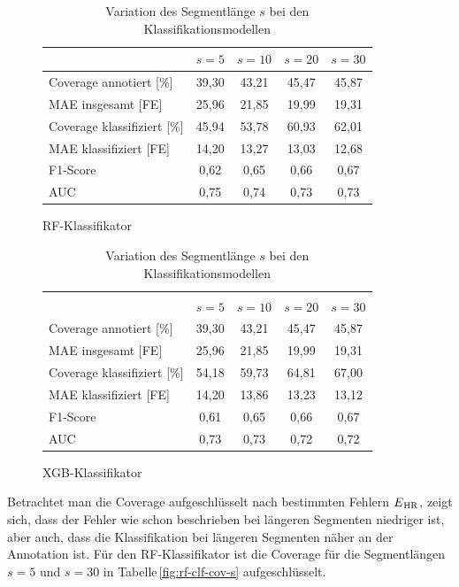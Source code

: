 \begin{table}[H]
	\begin{subfigure}{\textwidth}
	\centering
	\begin{tabular}{l || c | c | c | c }
								& $s = 5$	& $s=10$		& $s=20$		& $s=30$	\\ \hline
	Coverage annotiert [\%]		& 39,30		& 43,21	 	& 45,47		& 45,87\\
	\ac{MAE} insgesamt [FE]		& 25,96		& 21,85		& 19,99		& 19,31\\\hline
 	Coverage klassifiziert [\%]	& 45,94		& 53,78 		& 60,93		& 62,01\\
 	\ac{MAE} klassifiziert [FE]	& 14,20		& 13,27		& 13,03		& 12,68\\
 	F1-Score 					& 0,62		& 0,65		& 0,66		& 0,67\\
 	AUC 						& 0,75		& 0,74		& 0,73		& 0,73\\
 	\end{tabular}	
	\caption{\ac{RF}-Klassifikator}
	\end{subfigure}
	\begin{subfigure}{\textwidth}
	\centering
	\begin{tabular}{l || c | c | c | c }
	\multicolumn{5}{l}{	}	\\
								& $s = 5$	& $s=10$		& $s=20$		& $s=30$	\\ \hline
								
	Coverage annotiert [\%]		& 39,30		& 43,21	 	& 45,47		& 45,87\\
	\ac{MAE} insgesamt [FE]		& 25,96		& 21,85		& 19,99		& 19,31\\\hline
 	Coverage klassifiziert [\%]	& 54,18		& 59,73 		& 64,81		& 67,00\\
 	\ac{MAE} klassifiziert [FE]	& 14,20		& 13,86		& 13,23		& 13,12\\
 	F1-Score 					& 0,61		& 0,65		& 0,66		& 0,67\\
 	AUC 						& 0,73		& 0,73		& 0,72		& 0,72\\
 	\end{tabular}		
	\caption{\ac{XGB}-Klassifikator}
	\end{subfigure}
	\caption{Variation des Segmentlänge $s$ bei den Klassifikationsmodellen}
	\label{fig:var-s-clf}
\end{table}

Betrachtet man die Coverage aufgeschlüsselt nach bestimmten Fehlern $E\textsubscript{HR}$, zeigt sich, dass der Fehler wie schon beschrieben bei längeren Segmenten niedriger ist, aber auch, dass die Klassifikation bei längeren Segmenten näher an der Annotation ist. Für den \ac{RF}-Klassifikator ist die Coverage für die Segmentlängen $s=5$ und $s=30$ in Tabelle\,\ref{fig:rf-clf-cov-s} aufgeschlüsselt.

